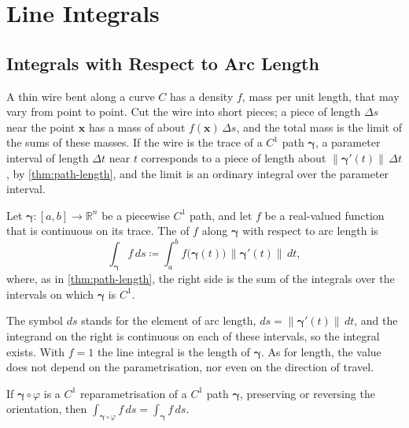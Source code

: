\section{Line Integrals}
\label{sec:line-integrals}

\subsection{Integrals with Respect to Arc Length}

A thin wire bent along a curve $C$ has a density $f$, mass per unit length, that may vary from point to point. Cut the wire into short pieces; a piece of length $\Delta s$ near the point $\mathbf x$ has a mass of about $f(\mathbf x)\,\Delta s$, and the total mass is the limit of the sums of these masses. If the wire is the trace of a $C^1$ path $\boldsymbol\gamma$, a parameter interval of length $\Delta t$ near $t$ corresponds to a piece of length about $\|\boldsymbol\gamma'(t)\|\,\Delta t$, by \cref{thm:path-length}, and the limit is an ordinary integral over the parameter interval.

\begin{definition}
\label{def:scalar-line-integral}
Let $\boldsymbol\gamma\colon[a,b]\to\mathbb R^n$ be a piecewise $C^1$ path, and let $f$ be a real-valued function that is continuous on its trace. The  of $f$ along $\boldsymbol\gamma$ with respect to arc length is
\[
\int_{\boldsymbol\gamma}f\,ds\coloneqq\int_a^bf\bigl(\boldsymbol\gamma(t)\bigr)\,\|\boldsymbol\gamma'(t)\|\,dt ,
\]
where, as in \cref{thm:path-length}, the right side is the sum of the integrals over the intervals on which $\boldsymbol\gamma$ is $C^1$.
\end{definition}

The symbol $ds$ stands for the element of arc length, $ds=\|\boldsymbol\gamma'(t)\|\,dt$, and the integrand on the right is continuous on each of these intervals, so the integral exists. With $f=1$ the line integral is the length of $\boldsymbol\gamma$. As for length, the value does not depend on the parametrisation, nor even on the direction of travel.

\begin{proposition}
\label{prop:scalar-line-invariant}
If $\boldsymbol\gamma\circ\varphi$ is a $C^1$ reparametrisation of a $C^1$ path $\boldsymbol\gamma$, preserving or reversing the orientation, then $\int_{\boldsymbol\gamma\circ\varphi}f\,ds=\int_{\boldsymbol\gamma}f\,ds$.
\end{proposition}

